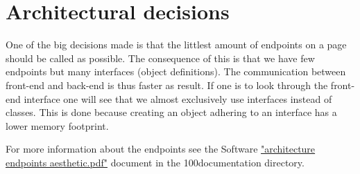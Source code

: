 \section{Architectural decisions}

One of the big decisions made is that the littlest amount of endpoints on a page should be called as possible. The consequence of this is that we have few endpoints but many interfaces (object definitions). The communication between front-end and back-end is thus faster as result. If one is to look through the front-end interface one will see that we almost exclusively use interfaces instead of classes. This is done because creating an object adhering to an interface has a lower memory footprint.

For more information about the endpoints see the Software \href{https://github.com/FSG1/mgmt/blob/master/100documentation/Software\%20architecture\%20endpoints\%20aesthetic.pdf}{"architecture endpoints aesthetic.pdf"} document in the 100documentation directory.